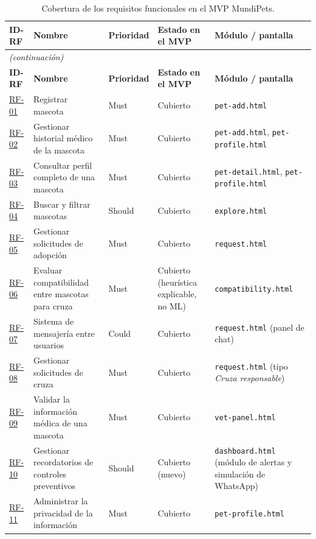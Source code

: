 \documentclass[journal,onecolumn]{IEEEtran}
\begin{document}
	\begin{longtable}{@{}p{1.5cm} p{5.2cm} p{1.7cm} p{3.0cm} p{3.4cm}@{}}
		\caption{Cobertura de los requisitos funcionales en el MVP MundiPets.}
		\label{tab:cobertura-mvp} \\
		\hline
		\textbf{ID-RF} & \textbf{Nombre} & \textbf{Prioridad} & \textbf{Estado en el MVP} & \textbf{Módulo / pantalla} \\
		\hline
		\endfirsthead
		\multicolumn{5}{|l|}{\textit{(continuación)}} \\
		\hline
		\textbf{ID-RF} & \textbf{Nombre} & \textbf{Prioridad} & \textbf{Estado en el MVP} & \textbf{Módulo / pantalla} \\
		\hline
		\endhead
		\hline
		\endfoot
		\hyperref[tab:RF-01]{RF-01} & Registrar mascota & Must & Cubierto & \texttt{pet-add.html} \\
		\hline
		\hyperref[tab:RF-02]{RF-02} & Gestionar historial médico de la mascota & Must & Cubierto & \texttt{pet-add.html}, \texttt{pet-profile.html} \\
		\hline
		\hyperref[tab:RF-03]{RF-03} & Consultar perfil completo de una mascota & Must & Cubierto & \texttt{pet-detail.html}, \texttt{pet-profile.html} \\
		\hline
		\hyperref[tab:RF-04]{RF-04} & Buscar y filtrar mascotas & Should & Cubierto & \texttt{explore.html} \\
		\hline
		\hyperref[tab:RF-05]{RF-05} & Gestionar solicitudes de adopción & Must & Cubierto & \texttt{request.html} \\
		\hline
		\hyperref[tab:RF-06]{RF-06} & Evaluar compatibilidad entre mascotas para cruza & Must & Cubierto (heurística explicable, no ML) & \texttt{compatibility.html} \\
		\hline
		\hyperref[tab:RF-07]{RF-07} & Sistema de mensajería entre usuarios & Could & Cubierto & \texttt{request.html} (panel de chat) \\
		\hline
		\hyperref[tab:RF-08]{RF-08} & Gestionar solicitudes de cruza & Must & Cubierto & \texttt{request.html} (tipo \emph{Cruza responsable}) \\
		\hline
		\hyperref[tab:RF-09]{RF-09} & Validar la información médica de una mascota & Must & Cubierto & \texttt{vet-panel.html} \\
		\hline
		\hyperref[tab:RF-10]{RF-10} & Gestionar recordatorios de controles preventivos & Should & Cubierto (nuevo) & \texttt{dashboard.html} (módulo de alertas y simulación de WhatsApp) \\
		\hline
		\hyperref[tab:RF-11]{RF-11} & Administrar la privacidad de la información & Must & Cubierto & \texttt{pet-profile.html} \\

\end{longtable}
\end{document}
